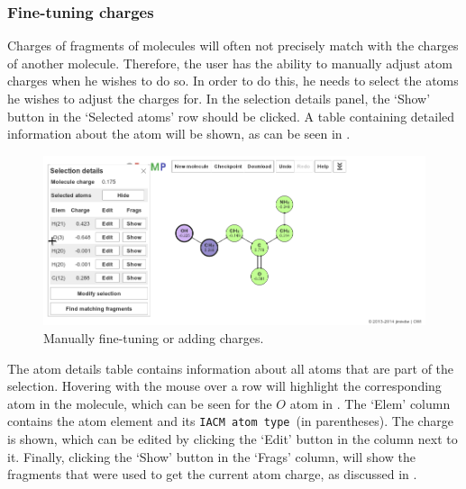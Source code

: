 \subsubsection{Fine-tuning charges}
Charges of fragments of molecules will often not precisely match with the charges of another molecule. Therefore, the user has the ability to manually adjust atom charges when he wishes to do so. In order to do this, he needs to select the atoms he wishes to adjust the charges for. In the selection details panel, the `Show' button in the `Selected atoms' row should be clicked. A table containing detailed information about the atom will be shown, as can be seen in .

\begin{figure}
\center
\includegraphics[width=.9\textwidth]{img/editing.png}
\caption{Manually fine-tuning or adding charges.}
\end{figure}

The atom details table contains information about all atoms that are part of the selection. Hovering with the mouse over a row will highlight the corresponding atom in the molecule, which can be seen for the $O$ atom in . The `Elem' column contains the atom element and its \verb|IACM atom type|~(in parentheses). The charge is shown, which can be edited by clicking the `Edit' button in the column next to it. Finally, clicking the `Show' button in the `Frags' column, will show the fragments that were used to get the current atom charge, as discussed in .




